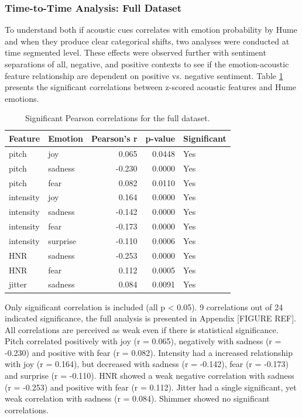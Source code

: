 \subsubsection{Time-to-Time Analysis: Full Dataset}
To understand both if acoustic cues correlates with emotion probability by Hume and when they produce clear categorical shifts, two analyses were conducted at time segmented level. 
These effects were observed further with sentiment separations of all, negative, and positive contexts to see if the emotion-acoustic feature relationship are dependent on positive vs. negative sentiment. 
Table \ref{tab:rq1_time_all_correlations} presents the significant correlations between z-scored acoustic features and Hume emotions.
\begin{table}[H]
    \centering
    \begin{tabular}{l l r r l}
      \toprule
      \textbf{Feature} & \textbf{Emotion} & \textbf{Pearson’s r} & \textbf{p-value} & \textbf{Significant} \\
      \midrule
        pitch      & joy     & 0.065         & 0.0448    & Yes         \\
        pitch      & sadness & -0.230        & 0.0000    & Yes         \\
        pitch      & fear    & 0.082         & 0.0110    & Yes         \\
        intensity  & joy     & 0.164         & 0.0000    & Yes         \\
        intensity  & sadness & -0.142        & 0.0000    & Yes         \\
        intensity  & fear    & -0.173        & 0.0000    & Yes         \\
        intensity  & surprise& -0.110        & 0.0006    & Yes         \\
        HNR        & sadness & -0.253        & 0.0000    & Yes         \\
        HNR        & fear    & 0.112         & 0.0005    & Yes         \\
        jitter     & sadness & 0.084         & 0.0091    & Yes         \\
      \bottomrule
    \end{tabular}
    \caption{Significant Pearson correlations for the full dataset.}
    \label{tab:rq1_time_all_correlations}
  \end{table}
 
  Only significant correlation is included (all p < 0.05). 9 correlations out of 24 indicated significance, the full analysis is presented in Appendix [FIGURE REF]. 
  All correlations are perceived as weak even if there is statistical significance. Pitch correlated positively with joy (r = 0.065), negatively with sadness (r = -0.230) and positive with fear (r = 0.082). 
  Intensity had a increased relationship with joy (r = 0.164), but decreased with sadness (r = -0.142), fear (r = -0.173) and surprise (r = -0.110). 
  HNR showed a weak negative correlation with sadness (r = -0.253) and positive with fear (r = 0.112). 
  Jitter had a single significant, yet weak correlation with sadness (r = 0.084). Shimmer showed no significant correlations. 

